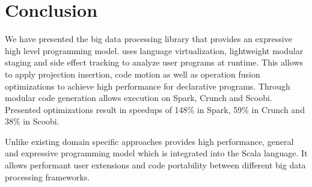 \section{Conclusion}
\label{sec:conclusion}

We have presented the big data processing library \tool that provides an expressive high level programming model. \tool uses language virtualization, lightweight modular staging and side effect tracking to analyze user programs at runtime. This allows \tool to apply projection insertion, code motion as well as operation fusion optimizations to achieve high performance for declarative programs. Through modular code generation \tool allows execution on Spark, Crunch and Scoobi. Presented optimizations result in speedups of 148\% in Spark, 59\% in Crunch and 38\% in Scoobi.   

Unlike existing domain specific approaches \tool provides high performance, general and expressive programming model which is integrated into the Scala language. It allows performant user extensions and code portability between different big data processing frameworks.